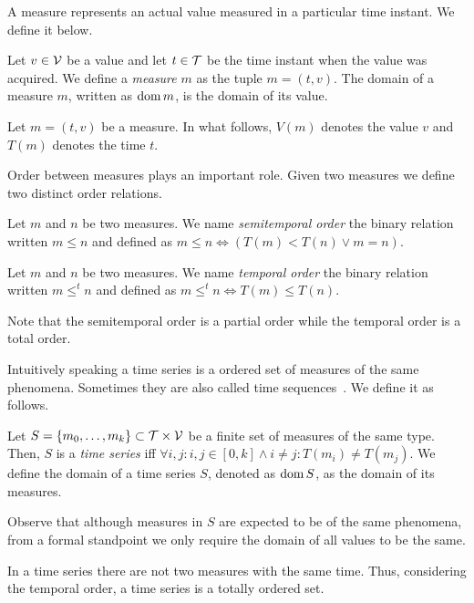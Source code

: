A measure represents an actual value measured in a particular time
instant. We define it below.

\begin{definition}[Measure]
  Let $v\in\cal{V}$ be a value and let $t\in\cal{T}$ be the time
  instant when the value was acquired. We define a \emph{measure} $m$
  as the tuple $m=(t,v)$. The domain of a measure $m$, written as
  $\operatorname{dom} m$, is the domain of its value.
\end{definition}

Let $m = (t,v)$ be a measure. In what follows, $V(m)$ denotes the
value $v$ and $T(m)$ denotes the time $t$.

Order between measures plays an important role. Given two measures we
define two distinct order relations.

\begin{definition}
  Let $m$ and $n$ be two measures. We name \emph{semitemporal order}
  the binary relation written $m\leq n$ and defined as $m\leq n\iff
  (T(m)<T(n) \vee m=n)$.
\end{definition}

\begin{definition} Let $m$ and $n$ be two measures. We
    name \emph{temporal order} the binary relation written $m \leq^t
    n$ and defined as $m \leq^t n \iff T(m) \leq T(n)$.
\end{definition}

Note that the semitemporal order is a partial order while the temporal
order is a total order.

Intuitively speaking a time series is a ordered set of measures of the
same phenomena.  Sometimes they are also called time
sequences~\cite{last:hetland}. We define it as follows.

\begin{definition}
  \label{def:model:timeseries}
  Let $S = \{m_0,\ldots,m_k\}\subset\cal{T}\times\cal{V}$ be a finite
  set of measures of the same type. Then, $S$ is a \emph{time series}
  iff $\forall i,j: i,j\in[0,k] \wedge i\neq j: T(m_i)\neq T(m_j)$.
  We define the domain of a time series $S$, denoted as $\operatorname{dom} S$, as
  the domain of its measures.
\end{definition}

Observe that although measures in $S$ are expected to be of the same
phenomena, from a formal standpoint we only require the domain of all
values to be the same. 

In a time series there are not two measures with the same time. Thus,
considering the temporal order, a time series is a totally ordered
set.

